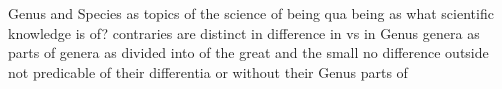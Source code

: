 
Genus and Species as topics of the science of being qua being
as what scientific knowledge is of?
contraries are distinct in
difference in vs in Genus
genera as parts of
genera as divided into
of the great and the small
no difference outside
not predicable of their differentia or without their Genus
parts of
